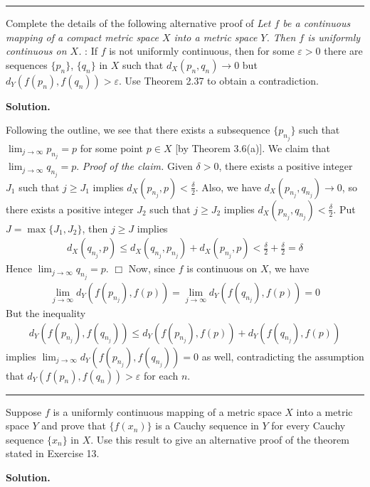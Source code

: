 \documentclass[12pt]{article}
\theoremstyle{definition}
\begin{document}
\bigskip\noindent\hrule\bigskip

Complete the details of the following alternative proof of 
\textit{Let $f$ be a continuous mapping of a compact metric space $X$ into a metric space $Y$. Then $f$ is uniformly continuous on $X$.}
: If $f$ is not uniformly continuous, then for some $\varepsilon>0$ there are sequences $\{p_n\}$, $\{q_n\}$ in $X$ such that $d_X(p_n,q_n)\to 0$ but $d_Y(f(p_n),f(q_n))>\varepsilon$. Use Theorem 2.37 to obtain a contradiction.

\smallskip
\noindent\textbf{Solution.}\quad

Following the outline, we see that there exists a subsequence $\{p_{n_j}\}$ such that $\lim_{j\to\infty}p_{n_j}=p$ for some point $p\in X$ [by Theorem 3.6(a)]. We claim that $\lim_{j\to\infty}q_{n_j}=p$.
\textit{Proof of the claim.} Given $\delta>0$, there exists a positive integer $J_1$ such that $j\ge J_1$ implies $d_X(p_{n_j},p)<\frac{\delta}{2}$. Also, we have $d_X(p_{n_j},q_{n_j})\to 0$, so there exists a positive integer $J_2$ such that $j\ge J_2$ implies $d_X(p_{n_j},q_{n_j})<\frac{\delta}{2}$. Put $J=\max\{J_1,J_2\}$, then $j\ge J$ implies
\begin{align*}
d_X(q_{n_j},p)
\le d_X(q_{n_j},p_{n_j})+d_X(p_{n_j},p)
<\frac{\delta}{2}+\frac{\delta}{2}
=\delta
\end{align*}
Hence $\lim_{j\to\infty}q_{n_j}=p$. $\Box$
Now, since $f$ is continuous on $X$, we have
\begin{align*}
\lim_{j\to\infty}d_Y(f(p_{n_j}),f(p))
=\lim_{j\to\infty}d_Y(f(q_{n_j}),f(p))
=0
\end{align*}
But the inequality
\begin{align*}
d_Y(f(p_{n_j}),f(q_{n_j}))
\le d_Y(f(p_{n_j}),f(p))+d_Y(f(q_{n_j}),f(p))
\end{align*}
implies $\lim_{j\to\infty}d_Y(f(p_{n_j}),f(q_{n_j}))=0$ as well, contradicting the assumption that $d_Y(f(p_n),f(q_n))>\varepsilon$ for each $n$.



\bigskip\noindent\hrule\bigskip

Suppose $f$ is a uniformly continuous mapping of a metric space $X$ into a metric space $Y$ and prove that $\{f(x_n)\}$ is a Cauchy sequence in $Y$ for every Cauchy sequence $\{x_n\}$ in $X$. Use this result to give an alternative proof of the theorem stated in Exercise 13.

\smallskip
\noindent\textbf{Solution.}\quad
\end{document}
